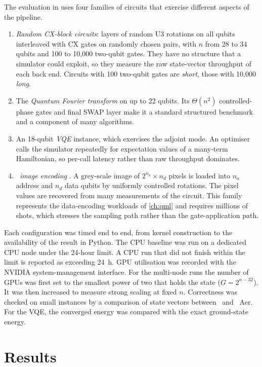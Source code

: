 The evaluation in \cite{guo2025qgear} uses four families of circuits that exercise different aspects of the pipeline.
\begin{enumerate}
  \item \emph{Random CX-block circuits}: layers of random U3 rotations on all qubits interleaved with CX gates on randomly chosen pairs, with $n$ from 28 to 34 qubits and 100 to 10,000 two-qubit gates. They have no structure that a simulator could exploit, so they measure the raw state-vector throughput of each back end. Circuits with 100 two-qubit gates are \emph{short}, those with 10,000 \emph{long}.
  \item The \emph{Quantum Fourier transform} on up to 22 qubits. Its $\Theta(n^{2})$ controlled-phase gates and final SWAP layer make it a standard structured benchmark and a component of many algorithms.
  \item An 18-qubit \emph{VQE} instance, which exercises the adjoint mode. An optimiser calls the simulator repeatedly for expectation values of a many-term Hamiltonian, so per-call latency rather than raw throughput dominates.
  \item \emph{\qcrank\ image encoding} \cite{balewski2024qcrank}. A grey-scale image of $2^{n_{a}}\times n_{d}$ pixels is loaded into $n_{a}$ address and $n_{d}$ data qubits by uniformly controlled rotations. The pixel values are recovered from many measurements of the circuit. This family represents the data-encoding workloads of \cref{ch:qml} and requires millions of shots, which stresses the sampling path rather than the gate-application path.
\end{enumerate}

Each configuration was timed end to end, from kernel construction to the availability of the result in Python. The CPU baseline was run on a dedicated CPU node under the 24-hour limit. A CPU run that did not finish within the limit is reported as exceeding \SI{24}{\hour}. GPU utilisation was recorded with the NVIDIA system-management interface. For the multi-node runs the number of GPUs was first set to the smallest power of two that holds the state ($G=2^{n-32}$). It was then increased to measure strong scaling at fixed $n$. Correctness was checked on small instances by a comparison of state vectors between \qgear\ and \qiskit\ Aer. For the VQE, the converged energy was compared with the exact ground-state energy.

\section{Results}\label{sec:qgear:results}

